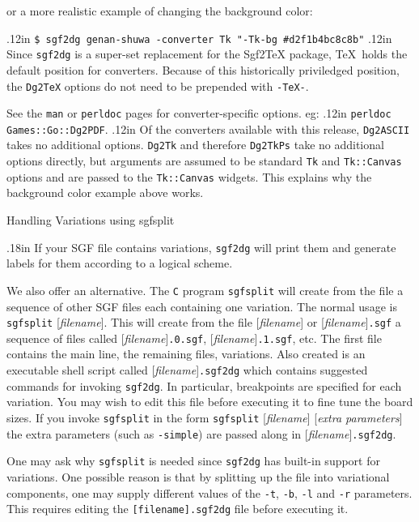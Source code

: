 \noindent
or a more realistic example of changing the background color:

\vglue.12in
    {\tt \$ sgf2dg genan-shuwa -converter Tk "-Tk-bg \#d2f1b4bc8c8b"}
\vglue.12in
Since {\tt sgf2dg} is a super-set replacement for the Sgf2TeX package,
\TeX\ holds the default position for converters.  Because of this
historically priviledged position, the {\tt Dg2TeX} options do not need to
be prepended with {\tt -TeX-}.

See the {\tt man} or {\tt perldoc} pages for converter-specific
options.  eg:
\vglue.12in
    {\tt perldoc Games::Go::Dg2PDF}.
\vglue.12in
Of the converters available with this release, {\tt Dg2ASCII} takes
no additional options.  {\tt Dg2Tk} and therefore {\tt Dg2TkPs} take
no additional options directly, but arguments are assumed to be
standard {\tt Tk} and {\tt Tk::Canvas} options and are passed to
the {\tt Tk::Canvas} widgets.  This explains why the background
color example above works.

\vfil\eject
\centerline{\titlefont Handling Variations using {\titlett sgfsplit}}
\vglue.18in
If your SGF file contains variations, {\tt sgf2dg} will print them
and generate labels for them according to a logical scheme.

We also offer an alternative. The {\tt C} program {\tt sgfsplit} will 
create from the file a sequence of other SGF files each containing
one variation. The normal usage is {\tt sgfsplit} [{\it filename}]. This will
create from the file [{\it filename}] or [{\it filename}]{\tt .sgf} a sequence of
files called [{\it filename}]{\tt .0.sgf}, [{\it filename}]{\tt .1.sgf}, etc. The first
file contains the main line, the remaining files, variations. Also
created is an executable shell script called [{\it filename}]{\tt .sgf2dg}
which contains suggested commands for invoking {\tt sgf2dg}. In particular,
breakpoints are specified for each variation. You may wish to edit this file
before executing it to fine tune the board sizes. If you invoke {\tt sgfsplit}
in the form {\tt sgfsplit} [{\it filename}] [{\it extra parameters}] the
extra parameters (such as {\tt -simple}) are passed along in 
[{\it filename}]{\tt .sgf2dg}.

One may ask why {\tt sgfsplit} is needed since {\tt sgf2dg} has built-in
support for variations. One possible reason is that by splitting up the
file into variational components, one may supply different values of
the {\tt -t}, {\tt -b}, {\tt -l} and {\tt -r} parameters. This requires
editing the {\tt [filename].sgf2dg} file before executing it.


